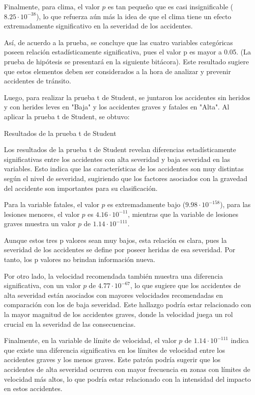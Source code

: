 \documentclass{book}
\begin{document}
Finalmente, para clima, el valor \( p \) es tan pequeño que es casi insignificable (\( 8.25 \cdot 10^{-38} \)), lo que refuerza aún más la idea de que el clima tiene un efecto extremadamente significativo en la severidad de los accidentes.


Así, de acuerdo a la prueba, se concluye que las cuatro variables categóricas poseen relación estadísticamente significativa, pues el valor p es mayor a 0.05. (La prueba de hipótesis se presentará en la siguiente bitácora). Este resultado sugiere que estos elementos deben ser considerados a la hora de analizar y prevenir accidentes de tránsito.

Luego, para realizar la prueba t de Student, se juntaron los accidentes sin heridos y con herides leves en "Baja" y los accidentes graves y fatales en "Alta". Al aplicar la prueba t de Student, se obtuvo:
\begin{table}[H]
\centering

\caption{Resultados de la prueba t de Student}
\end{table}

Los resultados de la prueba t de Student revelan diferencias estadísticamente significativas entre los accidentes con alta severidad y baja severidad en las variables. Esto indica que las características de los accidentes son muy distintas según el nivel de severidad, sugiriendo que los factores asociados con la gravedad del accidente son importantes para su clasificación.

Para la variable fatales, el valor $p$ es extremadamente bajo ($9.98 \cdot 10^{-158}$), para las lesiones menores, el valor $p$ es $4.16 \cdot 10^{-11}$, mientras que la variable de lesiones graves muestra un valor $p$ de $1.14 \cdot 10^{-111}$.

Aunque estos tres p valores sean muy bajos, esta relación es clara, pues la severidad de los accidentes se define por poseer heridas de esa severidad. Por tanto, los p valores no brindan información nueva.

Por otro lado, la velocidad recomendada también muestra una diferencia significativa, con un valor $p$ de $4.77 \cdot 10^{-67}$, lo que sugiere que los accidentes de alta severidad están asociados con mayores velocidades recomendadas en comparación con los de baja severidad. Este hallazgo podría estar relacionado con la mayor magnitud de los accidentes graves, donde la velocidad juega un rol crucial en la severidad de las consecuencias.

Finalmente, en la variable de límite de velocidad, el valor $p$ de $1.14 \cdot 10^{-111}$ indica que existe una diferencia significativa en los límites de velocidad entre los accidentes graves y los menos graves. Este patrón podría sugerir que los accidentes de alta severidad ocurren con mayor frecuencia en zonas con límites de velocidad más altos, lo que podría estar relacionado con la intensidad del impacto en estos accidentes.
\end{document}
